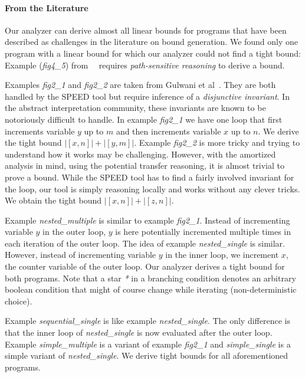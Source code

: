\documentclass[nocopyrightspace,preprint]{sigplanconf}
\begin{document}
{\paragraph{From  the Literature}

Our analyzer can derive almost all linear bounds for programs that
have been described as challenges in the literature on bound
generation.  We found only one program with a linear bound for
which our analyzer could not find a tight bound:  Example
(\emph{fig4\_5}) from~~\cite{GulwaniJK09} requires \emph{path-sensitive
  reasoning} to derive a bound.

Examples \emph{fig2\_1} and \emph{fig2\_2} are taken from Gulwani et
al~\cite{GulwaniMC09}.  They are both handled by the SPEED tool but
require inference of a \emph{disjunctive invariant}.  In the abstract
interpretation community, these invariants are known to be notoriously
difficult to handle.
%
In example \emph{fig2\_1} we have one loop that first increments
variable $y$ up to $m$ and then increments variable $x$ up to $n$.  We
derive the tight bound $|[x, n]| + |[y, m]|$.
%
Example \emph{fig2\_2} is more tricky and trying to understand how it
works may be challenging.  However, with the amortized analysis in
mind, using the potential transfer reasoning, it is almost trivial to
prove a bound.  While the SPEED tool has to find a fairly
involved invariant for the loop, our tool is simply reasoning locally
and works without any clever tricks. We obtain the tight bound $|[x,
n]| + |[z, n]|$.

Example \emph{nested\_multiple} is similar to example \emph{fig2\_1}.
Instead of incrementing variable $y$ in the outer loop, $y$ is here
potentially incremented multiple times in each iteration of the outer
loop.  The idea of example \emph{nested\_single} is similar.  However,
instead of incrementing variable $y$ in the inner loop, we increment
$x$, the counter variable of the outer loop. Our analyzer derives a
tight bound for both programs.  Note that a star \emph{*} in a
branching condition denotes an arbitrary boolean condition that might
of course change while iterating (non-deterministic choice).

Example \emph{sequential\_single} is like example
\emph{nested\_single}.  The only difference is that the inner loop of
\emph{nested\_single} is now evaluated after the outer loop.  Example
\emph{simple\_multiple} is a variant of example \emph{fig2\_1} and
\emph{simple\_single} is a simple variant of \emph{nested\_single}.
We derive tight bounds for all aforementioned programs.

}
\end{document}
